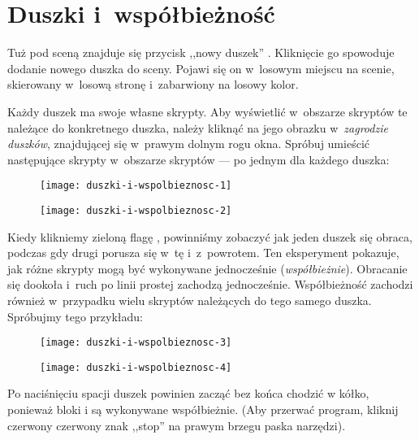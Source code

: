\documentclass[a4paper]{report}
\begin{document}

\section{Duszki i~współbieżność}

Tuż pod sceną znajduje się przycisk ,,nowy duszek'' . Kliknięcie go spowoduje dodanie nowego duszka do sceny. Pojawi się on w~losowym miejscu na scenie, skierowany w~losową stronę i~zabarwiony na losowy kolor.

Każdy duszek ma swoje własne skrypty. Aby wyświetlić w~obszarze skryptów te należące do konkretnego duszka, należy kliknąć na jego obrazku w~\emph{zagrodzie duszków}, znajdującej się w~prawym dolnym rogu okna. Spróbuj umieścić następujące skrypty w~obszarze skryptów --- po jednym dla każdego duszka:\nopagebreak

\begin{figure}[H]
\begin{minipage}{0.5\textwidth}
\centering
\texttt{[image: duszki-i-wspolbieznosc-1]}
\end{minipage}%
\begin{minipage}{0.5\textwidth}
\centering
\texttt{[image: duszki-i-wspolbieznosc-2]}
\end{minipage}
\end{figure}

Kiedy klikniemy zieloną flagę , powinniśmy zobaczyć jak jeden duszek się obraca, podczas gdy drugi porusza się w~tę i~z~powrotem. Ten eksperyment pokazuje, jak różne skrypty mogą być wykonywane jednocześnie (\emph{współbieżnie}). Obracanie się dookoła i~ruch po linii prostej zachodzą jednocześnie. Współbieżność zachodzi również w~przypadku wielu skryptów należących do tego samego duszka. Spróbujmy tego przykładu:\nopagebreak

\begin{figure}[H]
\begin{minipage}{0.5\textwidth}
\centering
\texttt{[image: duszki-i-wspolbieznosc-3]}
\end{minipage}%
\begin{minipage}{0.5\textwidth}
\centering
\texttt{[image: duszki-i-wspolbieznosc-4]}
\end{minipage}
\end{figure}

Po naciśnięciu spacji duszek powinien zacząć bez końca chodzić w kółko, ponieważ bloki  i  są wykonywane współbieżnie. (Aby przerwać program, kliknij czerwony czerwony znak ,,stop''  na prawym brzegu paska narzędzi).
\end{document}
